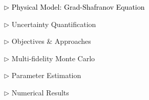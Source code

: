 \documentclass{beamer}
\begin{document}
\begin{frame}[noframenumbering]
\large 	
\textcolor{mygray1}{
    \begin{itemize}[leftmargin=5pt] 
        \item[\textcolor{black}{$\triangleright$}] \textcolor{black}{\fontsize{25}{60}\selectfont Physical Model: Grad-Shafranov Equation}
        \vspace{0.2cm}	
        \item[$\triangleright$] Uncertainty Quantification
        \vspace{0.2cm}
        \item[$\triangleright$] Objectives \& Approaches
        \vspace{0.2cm}
        \item[$\triangleright$] Multi-fidelity Monte Carlo
        \vspace{0.2cm}
        \item[$\triangleright$] Parameter Estimation
        \vspace{0.2cm}
        \item[$\triangleright$] Numerical Results
    \end{itemize}
}
\end{frame}
\end{document}
